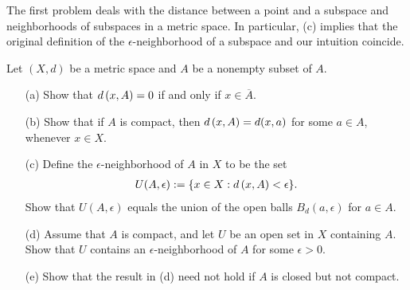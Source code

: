The first problem deals with the distance between a point and a subspace and neighborhoods of subspaces in a metric space.
In particular, (c) implies that the original definition of the $\epsilon$-neighborhood of a subspace and our intuition coincide.
\begin{prob}
    Let $(X, d)$ be a metric space and $A$ be a nonempty subset of $A$.
    \begin{enumerate}
        \item[(a)] Show that ${d}\left({x},{A}\right)=0$ if and only if $x\in\overline{A}$.
        \item[(b)] Show that if $A$ is compact, then ${d}\left({x},{A}\right)=d(x, a)$ for some $a\in A$, whenever $x\in X$.
        \item[(c)] Define the $\epsilon$-neighborhood of $A$ in $X$ to be the set
            \begin{align*}
                U(A, \epsilon):=\{x\in X:{d}\left({x},{A}\right)<\epsilon\}.
            \end{align*}
            Show that $U(A, \epsilon)$ equals the union of the open balls $B_d(a, \epsilon)$ for $a\in A$.
        \item[(d)] Assume that $A$ is compact, and let $U$ be an open set in $X$ containing $A$.
            Show that $U$ contains an $\epsilon$-neighborhood of $A$ for some $\epsilon>0$.
        \item[(e)] Show that the result in (d) need not hold if $A$ is closed but not compact.
    \end{enumerate}
\end{prob}
